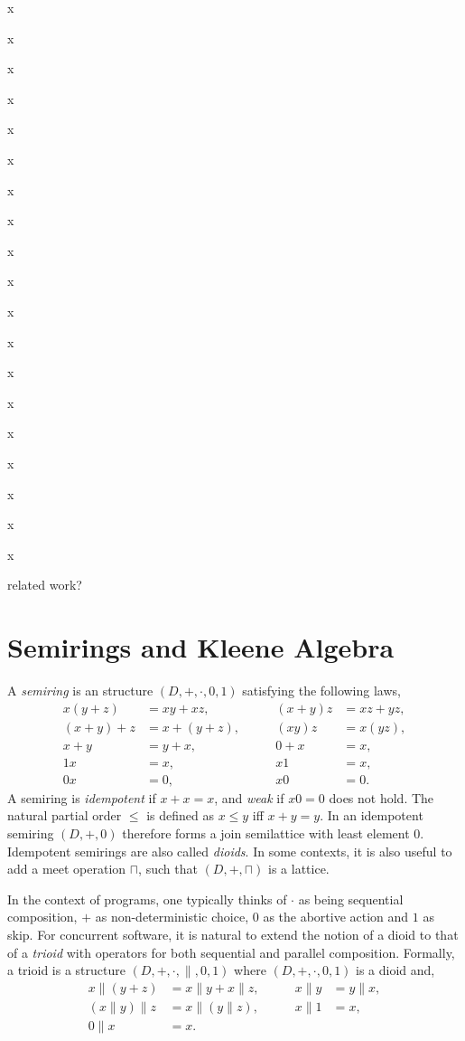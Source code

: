 \documentclass{llncs}
\begin{document}
x

x

x

x

x

x

x

x

x

x

x

x

x

x

x

x

x

x

x

related work?

\newpage
\section{Semirings and Kleene Algebra}
\label{sec:KA}

A \emph{semiring} is an structure
$(D,+,\cdot,0,1)$ satisfying the following laws,
\begin{align*}
  x(y + z) &= xy + xz, &\qquad (x + y)z &= xz + yz,\\
  (x + y) + z &= x + (y + z), &\qquad (xy)z &= x(yz),\\
  x + y &= y + x, &\qquad 0 + x &= x,\\
  1x &= x, &\qquad x1 &= x,\\
  0x &= 0, &\qquad x0 &= 0.
\end{align*}
A semiring is \emph{idempotent} if $x + x = x$, and \emph{weak} if $x0
= 0$ does not hold. The natural partial order $\le$ is defined as $x
\le y $ iff $x + y = y$. In an idempotent semiring $(D,+,0)$ therefore
forms a join semilattice with least element $0$. Idempotent semirings
are also called \emph{dioids}. In some contexts, it is also useful to
add a meet operation $\sqcap$, such that $(D,+,\sqcap)$ is a lattice.

In the context of programs, one typically thinks of $\cdot$ as being
sequential composition, $+$ as non-deterministic choice, $0$ as the
abortive action and $1$ as skip. For concurrent software, it is
natural to extend the notion of a dioid to that of a \emph{trioid}
with operators for both sequential and parallel composition. Formally,
a trioid is a structure $(D,+,\cdot,\|,0,1)$ where $(D,+,\cdot,0,1)$
is a dioid and,
\begin{align*}
  x\|(y + z) &= x\|y + x\|z, &\qquad x\|y &= y\|x,\\
  (x\|y)\|z &= x\|(y\|z), &\qquad x\|1 &= x,\\
  0\|x &= x.
\end{align*}
\end{document}
